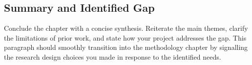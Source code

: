 \subsection{Summary and Identified Gap}
Conclude the chapter with a concise synthesis. Reiterate the main themes,
clarify the limitations of prior work, and state how your project addresses the
gap. This paragraph should smoothly transition into the methodology chapter by
signalling the research design choices you made in response to the identified
needs.
